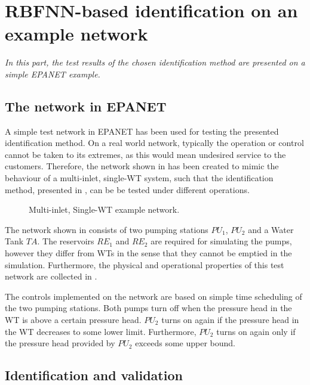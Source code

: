 \chapter{RBFNN-based identification on an example network}
\label{NN_based_example}

\emph{In this part, the test results of the chosen identification method are presented on a simple EPANET example. }

\section{The network in EPANET}
\label{example1_EPANET}

A simple test network in EPANET has been used for testing the presented identification method. On a real world network, typically the operation or control cannot be taken to its extremes, as this would mean undesired service to the customers. Therefore, the network shown in  has been created to mimic the behaviour of a multi-inlet, single-WT system, such that the identification method, presented in , can be be tested under different operations. 

\begin{figure}[H]
\centering
 
\caption{Multi-inlet, Single-WT example network.}
\label{fig:epanet_example1_id}
\end{figure}
\vspace{-3mm}

The network shown in  consists of two pumping stations $PU_1$, $PU_2$ and a Water Tank $TA$. The reservoirs $RE_1$ and $RE_2$ are required for simulating the pumps, however they differ from WTs in the sense that they cannot be emptied in the simulation. Furthermore, the physical and operational properties of this test network are collected in .

The controls implemented on the network are based on simple time scheduling of the two pumping stations. Both pumps turn off when the pressure head in the WT is above a certain pressure head. $PU_2$ turns on again if the pressure head in the WT decreases to some lower limit. Furthermore, $PU_2$ turns on again only if the pressure head provided by $PU_2$ exceeds some upper bound. 

\section{Identification and validation}
\label{identification_and_validation_of_the_output_eq} 

